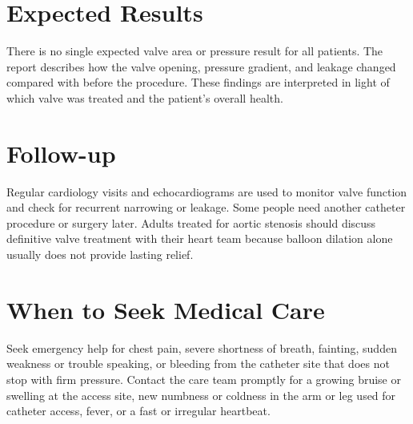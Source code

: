 \section*{Expected Results}
There is no single expected valve area or pressure result for all patients. The report describes how the valve opening, pressure gradient, and leakage changed compared with before the procedure. These findings are interpreted in light of which valve was treated and the patient's overall health.

\section*{Follow-up}
Regular cardiology visits and echocardiograms are used to monitor valve function and check for recurrent narrowing or leakage. Some people need another catheter procedure or surgery later. Adults treated for aortic stenosis should discuss definitive valve treatment with their heart team because balloon dilation alone usually does not provide lasting relief.

\section*{When to Seek Medical Care}
Seek emergency help for chest pain, severe shortness of breath, fainting, sudden weakness or trouble speaking, or bleeding from the catheter site that does not stop with firm pressure. Contact the care team promptly for a growing bruise or swelling at the access site, new numbness or coldness in the arm or leg used for catheter access, fever, or a fast or irregular heartbeat.

